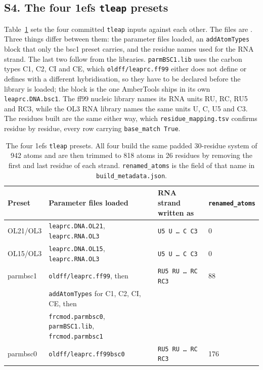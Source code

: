 \subsection*{S4. The four 1efs \texttt{tleap} presets}

Table~\ref{tab:si-presets} sets the four committed \texttt{tleap}
inputs against each other. The files are
. Three things differ
between them: the parameter files loaded, an \texttt{addAtomTypes} block
that only the bsc1 preset carries, and the residue names used for the RNA strand.
The last two follow from the libraries. \texttt{parmBSC1.lib} uses the
carbon types C1, C2, CI and CE, which \texttt{oldff/leaprc.ff99} either
does not define or defines with a different hybridisation, so they have to be
declared before the library is loaded; the block is the one AmberTools ships in
its own \texttt{leaprc.DNA.bsc1}. The ff99 nucleic library names its RNA
units RU, RC, RU5 and RC3, while the OL3 RNA library names the same units U, C,
U5 and C3. The residues built are the same either way, which
\texttt{residue\_mapping.tsv} confirms residue by residue, every row
carrying \texttt{base\_match True}.

\begin{table}[h]
\centering
\footnotesize
\caption{The four 1efs \texttt{tleap} presets. All four build the same padded
30-residue system of 942 atoms and are then trimmed to 818 atoms in 26 residues
by removing the first and last residue of each strand.
\texttt{renamed\_atoms} is the field of that name in
\texttt{build\_metadata.json}.}
\label{tab:si-presets}
\begin{tabular}{llll}
\toprule
Preset & Parameter files loaded & RNA strand written as & \texttt{renamed\_atoms} \\
\midrule
OL21/OL3 & \texttt{leaprc.DNA.OL21}, \texttt{leaprc.RNA.OL3} & \texttt{U5 U \dots{} C C3} & 0 \\
OL15/OL3 & \texttt{leaprc.DNA.OL15}, \texttt{leaprc.RNA.OL3} & \texttt{U5 U \dots{} C C3} & 0 \\
parmbsc1 & \texttt{oldff/leaprc.ff99}, then & \texttt{RU5 RU \dots{} RC RC3} & 88 \\
         & \texttt{addAtomTypes} for C1, C2, CI, CE, then & & \\
         & \texttt{frcmod.parmbsc0}, \texttt{parmBSC1.lib}, \texttt{frcmod.parmbsc1} & & \\
parmbsc0 & \texttt{oldff/leaprc.ff99bsc0} & \texttt{RU5 RU \dots{} RC RC3} & 176 \\
\bottomrule
\end{tabular}
\end{table}

